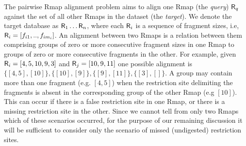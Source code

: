 The pairwise Rmap alignment problem aims to align one Rmap (the \emph{query}) $\mbox{\rm {\sf R}}_q$ against the set of all other Rmaps in the dataset (the \emph{target}). We denote the target database as $\mbox{\rm {\sf R}}_1 \ldots \mbox{\rm {\sf R}}_n$, where each $\mbox{\rm {\sf R}}_i$  is a sequence of fragment sizes, i.e, $\mbox{\rm {\sf R}}_i = [f_{i1}, .., f_{im_i}]$.  An alignment between two Rmaps is a relation between them comprising groups of zero or more consecutive fragment sizes in one Rmap to groups of zero or more consecutive fragments in the other.  For example, given $\mbox{\rm {\sf R}}_i =  [4, 5, 10, 9, 3]$ and $\mbox{\rm {\sf R}}_j = [10, 9, 11]$ one possible alignment is $\{[4,5], [10]\}, \{ [10], [9]\}, \{[9], [11]\}, \{[3], []\}$.  A group may contain more than one fragment (e.g. $[4,5]$) when the restriction site delimiting the fragments is absent in the corresponding group of the other Rmap (e.g $[10]$). This can occur if there is a false restriction site in one Rmap, or there is a missing restriction site in the other.  Since we cannot tell from only two Rmaps which of these scenarios occurred, for the purpose of our remaining discussion it will be sufficient to consider only the scenario of missed (undigested) restriction sites. %


